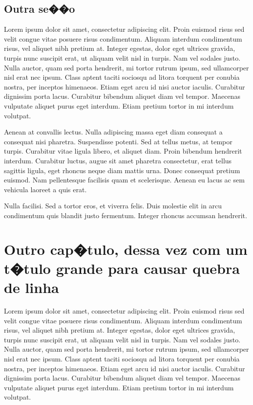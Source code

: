 \documentclass{ppgccufscar}
\begin{document}
\section{Outra se��o}

Lorem ipsum dolor sit amet, consectetur adipiscing elit. Proin euismod risus sed velit congue vitae posuere risus condimentum. Aliquam interdum condimentum risus, vel aliquet nibh pretium at. Integer egestas, dolor eget ultrices gravida, turpis nunc suscipit erat, ut aliquam velit nisl in turpis. Nam vel sodales justo. Nulla auctor, quam sed porta hendrerit, mi tortor rutrum ipsum, sed ullamcorper nisl erat nec ipsum. Class aptent taciti sociosqu ad litora torquent per conubia nostra, per inceptos himenaeos. Etiam eget arcu id nisi auctor iaculis. Curabitur dignissim porta lacus. Curabitur bibendum aliquet diam vel tempor. Maecenas vulputate aliquet purus eget interdum. Etiam pretium tortor in mi interdum volutpat.

Aenean at convallis lectus. Nulla adipiscing massa eget diam consequat a consequat nisi pharetra. Suspendisse potenti. Sed at tellus metus, at tempor turpis. Curabitur vitae ligula libero, et aliquet diam. Proin bibendum hendrerit interdum. Curabitur luctus, augue sit amet pharetra consectetur, erat tellus sagittis ligula, eget rhoncus neque diam mattis urna. Donec consequat pretium euismod. Nam pellentesque facilisis quam et scelerisque. Aenean eu lacus ac sem vehicula laoreet a quis erat.

Nulla facilisi. Sed a tortor eros, et viverra felis. Duis molestie elit in arcu condimentum quis blandit justo fermentum. Integer rhoncus accumsan hendrerit.

\chapter{Outro cap�tulo, dessa vez com um t�tulo grande para causar quebra de linha}

Lorem ipsum dolor sit amet, consectetur adipiscing elit. Proin euismod risus sed velit congue vitae posuere risus condimentum. Aliquam interdum condimentum risus, vel aliquet nibh pretium at. Integer egestas, dolor eget ultrices gravida, turpis nunc suscipit erat, ut aliquam velit nisl in turpis. Nam vel sodales justo. Nulla auctor, quam sed porta hendrerit, mi tortor rutrum ipsum, sed ullamcorper nisl erat nec ipsum. Class aptent taciti sociosqu ad litora torquent per conubia nostra, per inceptos himenaeos. Etiam eget arcu id nisi auctor iaculis. Curabitur dignissim porta lacus. Curabitur bibendum aliquet diam vel tempor. Maecenas vulputate aliquet purus eget interdum. Etiam pretium tortor in mi interdum volutpat.
\end{document}
